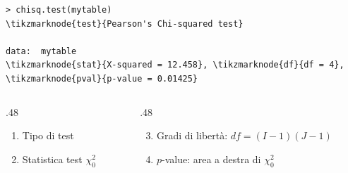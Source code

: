 \documentclass[
  ignorenonframetext,
  compress, aspectratio=149]{beamer}
\begin{document}
\begin{frame}[fragile]{}
\label{section-5}
\begin{Verbatim}[commandchars=\\\{\}, fontsize=\scriptsize, frame=single, framesep=2mm]
> chisq.test(mytable)
\tikzmarknode{test}{Pearson's Chi-squared test}

data:  mytable
\tikzmarknode{stat}{X-squared = 12.458}, \tikzmarknode{df}{df = 4}, \tikzmarknode{pval}{p-value = 0.01425}
\end{Verbatim}

\vspace{-3mm}
\begin{columns}[T]
\begin{column}{.48\textwidth}
\footnotesize
\begin{enumerate}
  \item Tipo di test
  \item Statistica test $\chi^2_0$
\end{enumerate}
\end{column}
\begin{column}{.48\textwidth}
\footnotesize
\begin{enumerate}
  \setcounter{enumi}{2}
  \item Gradi di libertà: $df = (I - 1)(J - 1)$
  \item $p$-value: area a destra di $\chi^2_0$
\end{enumerate}
\end{column}
\end{columns}
\end{frame}
\end{document}
